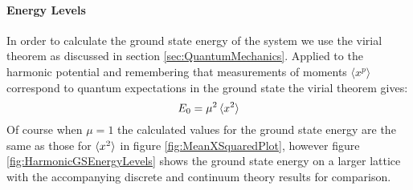 \documentclass[12pt]{article}
\begin{document}
            \paragraph{Energy Levels}
                In order to calculate the ground state energy of the system we use the virial theorem as discussed in section \ref{sec:QuantumMechanics}. Applied to the harmonic potential and remembering that measurements of moments $\langle x^p\rangle$ correspond to quantum expectations in the ground state the virial theorem gives:
                \begin{equation}
                    \label{eq:HarmonicGroundStateEnergy}
                    E_0 = \mu^2\braket{x^2}
                \end{equation}
                Of course when $\mu=1$ the calculated values for the ground state energy are the same as those for $\braket{x^2}$ in figure \ref{fig:MeanXSquaredPlot}, however figure \ref{fig:HarmonicGSEnergyLevels} shows the ground state energy on a larger lattice with the accompanying discrete and continuum theory results for comparison.
\end{document}

